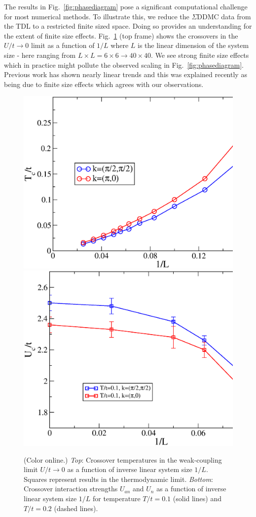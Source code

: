 \documentclass[twocolumn,notitlepage,prl,superscriptaddress,showpacs]{revtex4-1}
\begin{document}
The results in Fig.~\ref{fig:phasediagram} pose a significant computational challenge for most numerical methods.  To illustrate this, we reduce the $\Sigma$DDMC data from the TDL to a restricted finite sized space. Doing so provides an understanding for the extent of finite size effects.  Fig.~\ref{fig:weakcoupling} (top frame) shows the crossovers  in the $U/t \to 0$ limit as a function of $1/L$ where $L$ is the linear dimension of the system size - here ranging from $L\times L=6\times6 \to 40\times40$.  We see strong finite size effects which in practice might pollute the observed scaling in Fig.~\ref{fig:phasediagram}.  Previous work has shown nearly linear trends\cite{schafer:2015} and this was explained recently as being due to finite size effects which agrees with our observations.\cite{vanloon:2018}  



\begin{figure}
\centering
\includegraphics[width=0.8\linewidth]{fig3a_sept2018.eps}\\
\includegraphics[width=0.8\linewidth]{fig3b_sept2018.eps}
\caption{\label{fig:weakcoupling}(Color online.) \emph{Top}: Crossover temperatures in the weak-coupling limit $U/t\rightarrow 0$ as a function of inverse linear system size $1/L$. Squares represent results in the thermodynamic limit. \emph{Bottom}:
Crossover interaction strengths $U_{an}$ and $U_n$ as a function of inverse linear system size $1/L$ for temperature $T/t=0.1$ (solid lines) and $T/t=0.2$ (dashed lines).}
\end{figure}
\end{document}
